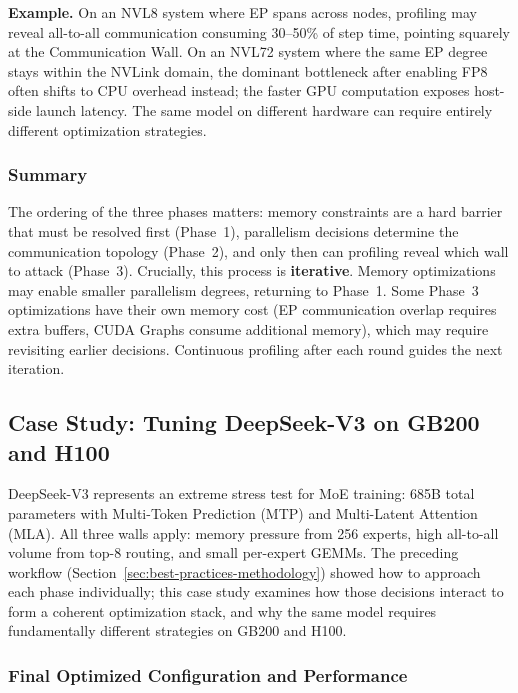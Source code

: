 \documentclass[10pt,logo,copyright]{nvidiatechreport}
\begin{document}
\noindent\textbf{Example.} On an NVL8 system where EP spans across nodes, profiling may reveal all-to-all communication consuming 30--50\% of step time, pointing squarely at the Communication Wall. On an NVL72 system where the same EP degree stays within the NVLink domain, the dominant bottleneck after enabling FP8 often shifts to CPU overhead instead; the faster GPU computation exposes host-side launch latency. The same model on different hardware can require entirely different optimization strategies.

\subsubsection{Summary}

The ordering of the three phases matters: memory constraints are a hard barrier that must be resolved first (Phase~1), parallelism decisions determine the communication topology (Phase~2), and only then can profiling reveal which wall to attack (Phase~3). Crucially, this process is \textbf{iterative}. Memory optimizations may enable smaller parallelism degrees, returning to Phase~1. Some Phase~3 optimizations have their own memory cost (EP communication overlap requires extra buffers, CUDA Graphs consume additional memory), which may require revisiting earlier decisions. Continuous profiling after each round guides the next iteration.

\subsection{Case Study: Tuning DeepSeek-V3 on GB200 and H100}\label{sec:deepseek-case-study}

DeepSeek-V3 represents an extreme stress test for MoE training: 685B total parameters with Multi-Token Prediction (MTP) and Multi-Latent Attention (MLA). All three walls apply: memory pressure from 256 experts, high all-to-all volume from top-8 routing, and small per-expert GEMMs. The preceding workflow (Section~\ref{sec:best-practices-methodology}) showed how to approach each phase individually; this case study examines how those decisions interact to form a coherent optimization stack, and why the same model requires fundamentally different strategies on GB200 and H100.

\subsubsection{Final Optimized Configuration and Performance}
\end{document}
